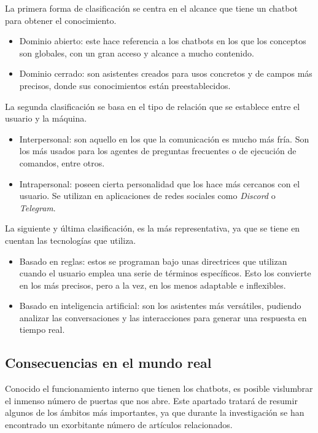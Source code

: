 La primera forma de clasificación se centra en el alcance que tiene un chatbot para obtener el conocimiento.
\begin{itemize}
    \item Dominio abierto: este hace referencia a los chatbots en los que los conceptos son globales, con un gran acceso y alcance a mucho contenido.
    \item Dominio cerrado: son asistentes creados para usos concretos y de campos más precisos, donde sus conocimientos están preestablecidos.
\end{itemize}

La segunda clasificación se basa en el tipo de relación que se establece entre el usuario y la máquina.
\begin{itemize}
    \item Interpersonal: son aquello en los que la comunicación es mucho más fría. Son los más usados para los agentes de preguntas frecuentes o de ejecución de comandos, entre otros.
    \item Intrapersonal: poseen cierta personalidad que los hace más cercanos con el usuario. Se utilizan en aplicaciones de redes sociales como \textit{Discord} o \textit{Telegram}.
\end{itemize}

La siguiente y última clasificación, es la más representativa, ya que se tiene en cuentan las tecnologías que utiliza.
\begin{itemize}
    \item Basado en reglas: estos se programan bajo unas directrices que utilizan cuando el usuario emplea una serie de términos específicos. Esto los convierte en los más precisos, pero a la vez, en los menos adaptable e inflexibles.
    \item Basado en inteligencia artificial: son los asistentes más versátiles, pudiendo analizar las conversaciones y las interacciones para generar una respuesta en tiempo real.
\end{itemize}

\subsection{Consecuencias en el mundo real}
Conocido el funcionamiento interno que tienen los chatbots, es posible vislumbrar el inmenso número de puertas que nos abre. Este apartado tratará de resumir algunos de los ámbitos más importantes, ya que durante la investigación se han encontrado un exorbitante número de artículos relacionados.

